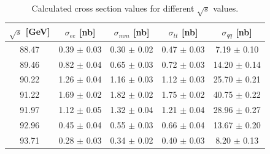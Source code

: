 \begin{table}[!h]
\centering
\begin{tabular}{c|cccc}
\hline
$\sqrt{s}$ {[}GeV{]} & $\sigma_{ee}$ {[}nb{]} & $\sigma_{mm}$ {[}nb{]} & $\sigma_{tt}$ {[}nb{]} & $\sigma_{qq}$ {[}nb{]} \\
\hline
88.47                & 0.39 $\pm$ 0.03        & 0.30 $\pm$ 0.02        & 0.47 $\pm$ 0.03        & 7.19 $\pm$ 0.10        \\
89.46                & 0.82 $\pm$ 0.04        & 0.65 $\pm$ 0.03        & 0.72 $\pm$ 0.03        & 14.20 $\pm$ 0.14       \\
90.22                & 1.26 $\pm$ 0.04        & 1.16 $\pm$ 0.03        & 1.12 $\pm$ 0.03        & 25.70 $\pm$ 0.21       \\
91.22                & 1.69 $\pm$ 0.02        & 1.82 $\pm$ 0.02        & 1.75 $\pm$ 0.02        & 40.75 $\pm$ 0.22       \\
91.97                & 1.12 $\pm$ 0.05        & 1.32 $\pm$ 0.04        & 1.21 $\pm$ 0.04        & 28.96 $\pm$ 0.27       \\
92.96                & 0.45 $\pm$ 0.04        & 0.55 $\pm$ 0.03        & 0.66 $\pm$ 0.04        & 13.67 $\pm$ 0.20       \\
93.71                & 0.28 $\pm$ 0.03        & 0.34 $\pm$ 0.02        & 0.40 $\pm$ 0.03        & 8.20 $\pm$ 0.13       \\
\hline
\end{tabular}
\caption{Calculated cross section values for different $\sqrt{s}$ values.}
\label{table:cross-section}
\end{table}

